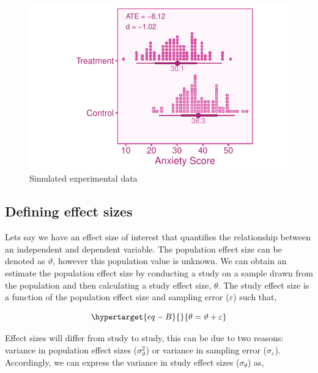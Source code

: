 \documentclass[
  letterpaper,
  DIV=11,
  numbers=noendperiod]{scrreprt}
\begin{document}
\begin{figure}

{\centering \includegraphics{intro_files/figure-pdf/unnamed-chunk-1-1.pdf}

}

\caption{Simulated experimental data}

\end{figure}

\hypertarget{defining-effect-sizes}{%
\subsection{Defining effect sizes}\label{defining-effect-sizes}}

Lets say we have an effect size of interest that quantifies the
relationship between an independent and dependent variable. The
population effect size can be denoted as \(\vartheta\), however this
population value is unknown. We can obtain an estimate the population
effect size by conducting a study on a sample drawn from the population
and then calculating a study effect size, \(\theta\). The study effect
size is a function of the population effect size and sampling error
(\(\varepsilon\)) such that,

\begin{equation}\protect\hypertarget{eq-B}{}{
\theta = \vartheta + \varepsilon
}\label{eq-B}\end{equation}

Effect sizes will differ from study to study, this can be due to two
reasons: variance in population effect sizes (\(\sigma^2_\vartheta\)) or
variance in sampling error (\(\sigma_\varepsilon\)). Accordingly, we can
express the variance in study effect sizes (\(\sigma_\theta\)) as,
\end{document}
